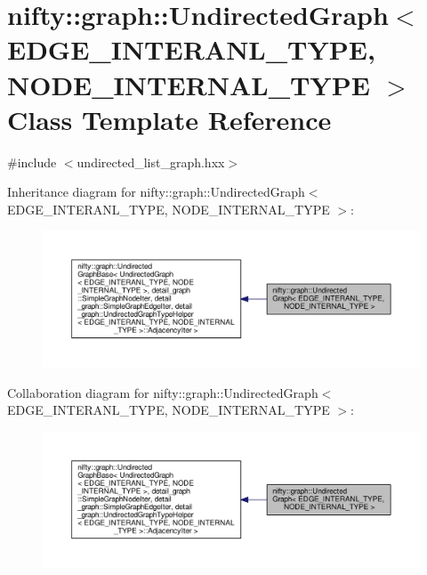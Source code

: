 \hypertarget{classnifty_1_1graph_1_1UndirectedGraph}{}\section{nifty\+:\+:graph\+:\+:Undirected\+Graph$<$ E\+D\+G\+E\+\_\+\+I\+N\+T\+E\+R\+A\+N\+L\+\_\+\+T\+Y\+P\+E, N\+O\+D\+E\+\_\+\+I\+N\+T\+E\+R\+N\+A\+L\+\_\+\+T\+Y\+P\+E $>$ Class Template Reference}
\label{classnifty_1_1graph_1_1UndirectedGraph}


{\ttfamily \#include $<$undirected\+\_\+list\+\_\+graph.\+hxx$>$}



Inheritance diagram for nifty\+:\+:graph\+:\+:Undirected\+Graph$<$ E\+D\+G\+E\+\_\+\+I\+N\+T\+E\+R\+A\+N\+L\+\_\+\+T\+Y\+P\+E, N\+O\+D\+E\+\_\+\+I\+N\+T\+E\+R\+N\+A\+L\+\_\+\+T\+Y\+P\+E $>$\+:\nopagebreak
\begin{figure}[H]
\begin{center}
\leavevmode
\includegraphics[width=350pt]{classnifty_1_1graph_1_1UndirectedGraph__inherit__graph}
\end{center}
\end{figure}


Collaboration diagram for nifty\+:\+:graph\+:\+:Undirected\+Graph$<$ E\+D\+G\+E\+\_\+\+I\+N\+T\+E\+R\+A\+N\+L\+\_\+\+T\+Y\+P\+E, N\+O\+D\+E\+\_\+\+I\+N\+T\+E\+R\+N\+A\+L\+\_\+\+T\+Y\+P\+E $>$\+:\nopagebreak
\begin{figure}[H]
\begin{center}
\leavevmode
\includegraphics[width=350pt]{classnifty_1_1graph_1_1UndirectedGraph__coll__graph}
\end{center}
\end{figure}
